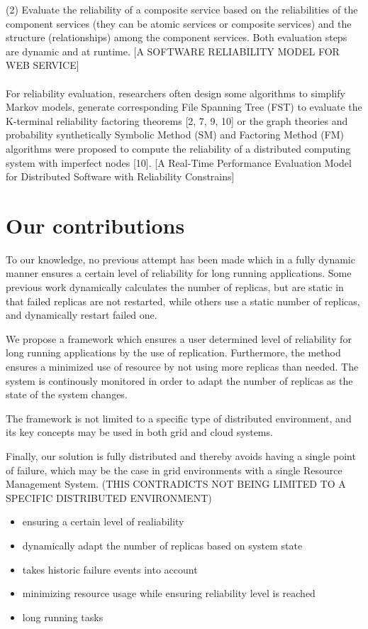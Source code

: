 \documentclass{cslthse-msc}
\begin{document}
(2) Evaluate the reliability of a composite service based on the reliabilities of the component services (they can be atomic services or composite services) and the structure (relationships) among the component services. Both evaluation steps are dynamic and at runtime. [A SOFTWARE RELIABILITY MODEL FOR WEB SERVICE]
\\\\
For reliability evaluation, researchers often design some algorithms to simplify Markov models, generate corresponding File Spanning Tree (FST) to evaluate the K-terminal reliability factoring theorems [2, 7, 9, 10] or the graph theories and probability synthetically 
Symbolic Method (SM) and Factoring Method (FM) algorithms were proposed to compute the reliability of a distributed computing system with imperfect nodes [10].
[A Real-Time Performance Evaluation Model for Distributed Software with Reliability Constrains]
\cite{taskSchedulingReplication}
\fi %

\section{Our contributions}
To our knowledge, no previous attempt has been made which in a fully dynamic manner ensures a certain level of reliability for long running applications. Some previous work dynamically calculates the number of replicas, but are static in that failed replicas are not restarted, while others use a static number of replicas, and dynamically restart failed one.

We propose a framework which ensures a user determined level of reliability for long running applications by the use of replication. Furthermore, the method ensures a minimized use of resource by not using more replicas than needed. The system is continously monitored in order to adapt the number of replicas as the state of the system changes.

The framework is not limited to a specific type of distributed environment, and its key concepts may be used in both grid and cloud systems.

Finally, our solution is fully distributed and thereby avoids having a single point of failure, which may be the case in grid environments with a single Resource Management System. (THIS CONTRADICTS NOT BEING LIMITED TO A SPECIFIC DISTRIBUTED ENVIRONMENT)


\iffalse
\begin{itemize}
\item ensuring a certain level of realiability
\item dynamically adapt the number of replicas based on system state
\item takes historic failure events into account
\item minimizing resource usage while ensuring reliability level is reached
\item long running tasks
\end{itemize}
\end{document}
